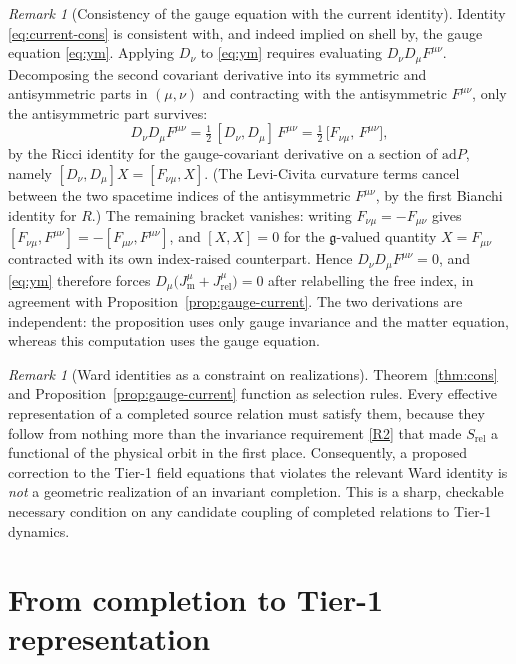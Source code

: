 \documentclass[11pt,a4paper]{article}
\theoremstyle{plain}
\theoremstyle{definition}
\theoremstyle{remark}
\newtheorem{remark}[theorem]{Remark}
\newcommand{\gfrak}{\mathfrak{g}}
\begin{document}
\begin{remark}[Consistency of the gauge equation with the current identity]
\label{rem:consistency-check}
Identity \eqref{eq:current-cons} is consistent with, and indeed implied on shell by, the gauge
equation \eqref{eq:ym}. Applying $D_\nu$ to \eqref{eq:ym} requires evaluating
$D_\nu D_\mu F^{\mu\nu}$. Decomposing the second covariant derivative into its symmetric and
antisymmetric parts in $(\mu,\nu)$ and contracting with the antisymmetric $F^{\mu\nu}$, only the
antisymmetric part survives:
\[
D_\nu D_\mu F^{\mu\nu}
=\tfrac12\,[D_\nu,D_\mu]\,F^{\mu\nu}
=\tfrac12\,\bigl[F_{\nu\mu},\,F^{\mu\nu}\bigr] ,
\]
by the Ricci identity for the gauge-covariant derivative on a section of $\mathrm{ad}P$, namely
$[D_\nu,D_\mu]X=[F_{\nu\mu},X]$. (The Levi-Civita curvature terms cancel between the two
spacetime indices of the antisymmetric $F^{\mu\nu}$, by the first Bianchi identity for $R$.) The
remaining bracket vanishes: writing $F_{\nu\mu}=-F_{\mu\nu}$ gives
$[F_{\nu\mu},F^{\mu\nu}]=-[F_{\mu\nu},F^{\mu\nu}]$, and $[X,X]=0$ for the $\gfrak$-valued
quantity $X=F_{\mu\nu}$ contracted with its own index-raised counterpart. Hence
$D_\nu D_\mu F^{\mu\nu}=0$, and \eqref{eq:ym} therefore forces
$D_\mu\bigl(J^{\mu}_{\mathrm{m}}+J^{\mu}_{\mathrm{rel}}\bigr)=0$ after relabelling the free index, in
agreement with
Proposition~\ref{prop:gauge-current}. The two derivations are independent: the proposition uses
only gauge invariance and the matter equation, whereas this computation uses the gauge equation.
\end{remark}

\begin{remark}[Ward identities as a constraint on realizations]
\label{rem:noether-constraint}
Theorem~\ref{thm:cons} and Proposition~\ref{prop:gauge-current} function as selection rules. Every
effective representation of a completed source relation must satisfy them,
because they follow from nothing more than the invariance requirement \ref{R2} that made
$S_{\mathrm{rel}}$ a functional of the physical orbit in the first place. Consequently, a proposed
correction to the Tier-1 field equations that violates the relevant Ward identity is \emph{not} a
geometric realization of an invariant completion. This is a sharp, checkable necessary condition on
any candidate coupling of completed relations to Tier-1 dynamics.
\end{remark}

\section{From completion to Tier-1 representation}
\label{sec:tier1}
\end{document}

